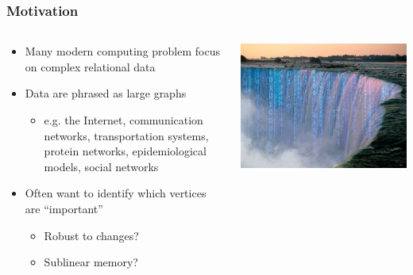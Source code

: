 \documentclass{beamer}
\begin{document}
\begin{frame}
\frametitle{Motivation}


\begin{columns}
\begin{column}{0.55\textwidth}
	\begin{itemize}
		\item Many modern computing problem focus on complex relational data
		\item Data are phrased as large graphs
		\begin{itemize}
			\item e.g. the Internet, communication networks, transportation systems, protein networks, epidemiological models, social networks
		\end{itemize}
		\item Often want to identify which vertices are ``important''
		\begin{itemize}
			\item Robust to changes?
			\item Sublinear memory?
		\end{itemize}
	\end{itemize}
\end{column}
\begin{column}{0.45\textwidth}  %
\begin{center}
	\includegraphics[width=1.0\textwidth]{bigdata}
\end{center}
\end{column}


\end{columns}
\end{frame}
\end{document}
